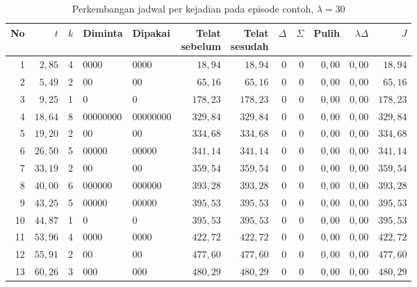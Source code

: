 \begin{table}[htbp]
\caption{Perkembangan jadwal per kejadian pada episode contoh, $\lambda = 30$}
\label{tab:episode-lam30}
\centering\footnotesize
\setlength{\tabcolsep}{4pt}
\begin{adjustbox}{max width=\textwidth}
\begin{tabular}{rrcllrrrrrrr}
\toprule
No & $t$ & $k$ & Diminta & Dipakai & \shortstack[r]{Telat\\sebelum} & \shortstack[r]{Telat\\sesudah} & $\Delta$ & $\Sigma$ & Pulih & $\lambda\Delta$ & $J$ \\
\midrule
1 & $2{,}85$ & 4 & 0000 & 0000 & $18{,}94$ & $18{,}94$ & 0 & 0 & $0{,}00$ & $0{,}00$ & $18{,}94$ \\
2 & $5{,}49$ & 2 & 00 & 00 & $65{,}16$ & $65{,}16$ & 0 & 0 & $0{,}00$ & $0{,}00$ & $65{,}16$ \\
3 & $9{,}25$ & 1 & 0 & 0 & $178{,}23$ & $178{,}23$ & 0 & 0 & $0{,}00$ & $0{,}00$ & $178{,}23$ \\
4 & $18{,}64$ & 8 & 00000000 & 00000000 & $329{,}84$ & $329{,}84$ & 0 & 0 & $0{,}00$ & $0{,}00$ & $329{,}84$ \\
5 & $19{,}20$ & 2 & 00 & 00 & $334{,}68$ & $334{,}68$ & 0 & 0 & $0{,}00$ & $0{,}00$ & $334{,}68$ \\
6 & $26{,}50$ & 5 & 00000 & 00000 & $341{,}14$ & $341{,}14$ & 0 & 0 & $0{,}00$ & $0{,}00$ & $341{,}14$ \\
7 & $33{,}19$ & 2 & 00 & 00 & $359{,}54$ & $359{,}54$ & 0 & 0 & $0{,}00$ & $0{,}00$ & $359{,}54$ \\
8 & $40{,}00$ & 6 & 000000 & 000000 & $393{,}28$ & $393{,}28$ & 0 & 0 & $0{,}00$ & $0{,}00$ & $393{,}28$ \\
9 & $43{,}25$ & 5 & 00000 & 00000 & $395{,}53$ & $395{,}53$ & 0 & 0 & $0{,}00$ & $0{,}00$ & $395{,}53$ \\
10 & $44{,}87$ & 1 & 0 & 0 & $395{,}53$ & $395{,}53$ & 0 & 0 & $0{,}00$ & $0{,}00$ & $395{,}53$ \\
11 & $53{,}96$ & 4 & 0000 & 0000 & $422{,}72$ & $422{,}72$ & 0 & 0 & $0{,}00$ & $0{,}00$ & $422{,}72$ \\
12 & $55{,}91$ & 2 & 00 & 00 & $477{,}60$ & $477{,}60$ & 0 & 0 & $0{,}00$ & $0{,}00$ & $477{,}60$ \\
13 & $60{,}26$ & 3 & 000 & 000 & $480{,}29$ & $480{,}29$ & 0 & 0 & $0{,}00$ & $0{,}00$ & $480{,}29$ \\

\end{tabular}
\end{adjustbox}
\end{table}
